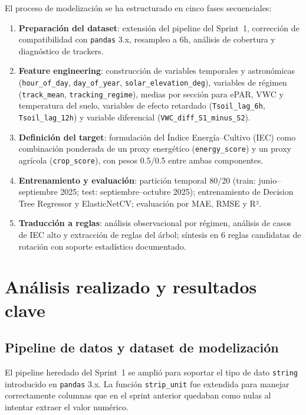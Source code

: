 \documentclass[12pt,a4paper]{article}
\begin{document}
El proceso de modelización se ha estructurado en cinco fases secuenciales:

\begin{enumerate}
  \item \textbf{Preparación del dataset}: extensión del pipeline del Sprint~1, corrección de compatibilidad con \texttt{pandas} 3.x, resampleo a 6h, análisis de cobertura y diagnóstico de trackers.
  \item \textbf{Feature engineering}: construcción de variables temporales y astronómicas (\texttt{hour\_of\_day}, \texttt{day\_of\_year}, \texttt{solar\_elevation\_deg}), variables de régimen (\texttt{track\_mean}, \texttt{tracking\_regime}), medias por sección para ePAR, VWC y temperatura del suelo, variables de efecto retardado (\texttt{Tsoil\_lag\_6h}, \texttt{Tsoil\_lag\_12h}) y variable diferencial (\texttt{VWC\_diff\_S1\_minus\_S2}).
  \item \textbf{Definición del target}: formulación del Índice Energía--Cultivo (IEC) como combinación ponderada de un proxy energético (\texttt{energy\_score}) y un proxy agrícola (\texttt{crop\_score}), con pesos 0.5/0.5 entre ambas componentes.
  \item \textbf{Entrenamiento y evaluación}: partición temporal 80/20 (train: junio--septiembre 2025; test: septiembre--octubre 2025); entrenamiento de Decision Tree Regressor y ElasticNetCV; evaluación por MAE, RMSE y R².
  \item \textbf{Traducción a reglas}: análisis observacional por régimen, análisis de casos de IEC alto y extracción de reglas del árbol; síntesis en 6 reglas candidatas de rotación con soporte estadístico documentado.
\end{enumerate}

\newpage
\section{Análisis realizado y resultados clave}

\subsection{Pipeline de datos y dataset de modelización}

El pipeline heredado del Sprint~1 se amplió para soportar el tipo de dato \texttt{string} introducido en \texttt{pandas} 3.x. La función \texttt{strip\_unit} fue extendida para manejar correctamente columnas que en el sprint anterior quedaban como nulas al intentar extraer el valor numérico.
\end{document}
